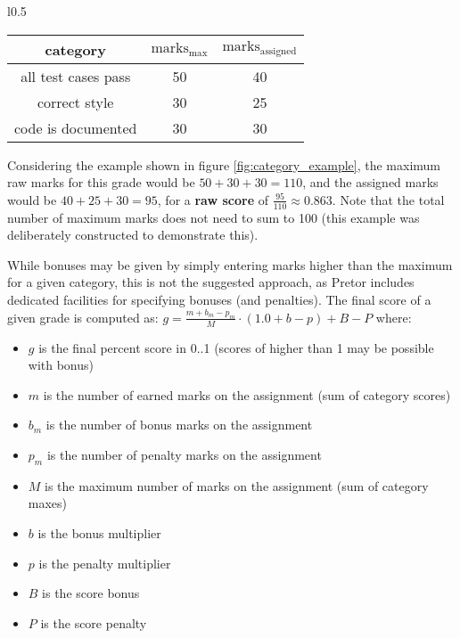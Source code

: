 \documentclass{book}
\begin{document}
\begin{wrapfigure}{l}{0.5\textwidth}

	\centering

	\begin{tabular}{c | c | c}

		category & $\text{marks}_\text{max}$ & $\text{marks}_\text{assigned}$ \\
		\hline\hline
		all test cases pass & 50 & 40 \\
		\hline
		correct style & 30 & 25 \\
		\hline
		code is documented & 30 & 30 \\

	\end{tabular}

	\caption{\label{fig:category_example} Example categories and assigned
	scores}

\end{wrapfigure}

Considering the example shown in figure \ref{fig:category_example}, the maximum
raw marks for this grade would be $50+30+30=110$, and the assigned marks would
be $40+25+30=95$, for a \textbf{raw score} of $\frac{95}{110} \approx 0.863$.
Note that the total number of maximum marks does not need to sum to 100 (this
example was deliberately constructed to demonstrate this).

While bonuses may be given by simply entering marks higher than the maximum for
a given category, this is not the suggested approach, as Pretor includes
dedicated facilities for specifying bonuses (and penalties). The final score of
a given grade is computed as: $g = \frac{m + b_m - p_m}{M} \cdot (1.0 + b - p)
+ B - P$ where:

\begin{itemize}

	\item $g$ is the final percent score in 0..1 (scores of higher than 1
		may be possible with bonus)

	\item $m$ is the number of earned marks on the assignment (sum of
		category scores)

	\item $b_m$ is the number of bonus marks on the assignment

	\item $p_m$ is the number of penalty marks on the assignment

	\item $M$ is the maximum number of marks on the assignment (sum of
		category maxes)

	\item $b$ is the bonus multiplier

	\item $p$ is the penalty multiplier

	\item $B$ is the score bonus

	\item $P$ is the score penalty

\end{itemize}
\end{document}
